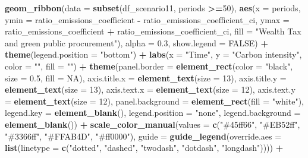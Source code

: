\documentclass[
]{article}
\newenvironment{Shaded}{\begin{snugshade}}{\end{snugshade}}
\newcommand{\AttributeTok}[1]{\textcolor[rgb]{0.13,0.29,0.53}{#1}}
\newcommand{\ConstantTok}[1]{\textcolor[rgb]{0.56,0.35,0.01}{#1}}
\newcommand{\DecValTok}[1]{\textcolor[rgb]{0.00,0.00,0.81}{#1}}
\newcommand{\FloatTok}[1]{\textcolor[rgb]{0.00,0.00,0.81}{#1}}
\newcommand{\FunctionTok}[1]{\textcolor[rgb]{0.13,0.29,0.53}{\textbf{#1}}}
\newcommand{\NormalTok}[1]{#1}
\newcommand{\SpecialCharTok}[1]{\textcolor[rgb]{0.81,0.36,0.00}{\textbf{#1}}}
\newcommand{\StringTok}[1]{\textcolor[rgb]{0.31,0.60,0.02}{#1}}
\begin{document}
\begin{Shaded}
\begin{Highlighting}[]
  \FunctionTok{geom\_ribbon}\NormalTok{(}\AttributeTok{data =} \FunctionTok{subset}\NormalTok{(df\_scenario11, periods }\SpecialCharTok{\textgreater{}=}\DecValTok{50}\NormalTok{), }\FunctionTok{aes}\NormalTok{(}\AttributeTok{x =}\NormalTok{ periods, }\AttributeTok{ymin =}\NormalTok{ ratio\_emissions\_coefficient }\SpecialCharTok{{-}}\NormalTok{ ratio\_emissions\_coefficient\_ci, }\AttributeTok{ymax =}\NormalTok{ ratio\_emissions\_coefficient }\SpecialCharTok{+}\NormalTok{ ratio\_emissions\_coefficient\_ci, }\AttributeTok{fill =} \StringTok{"Wealth Tax and green public procurement"}\NormalTok{), }\AttributeTok{alpha =} \FloatTok{0.3}\NormalTok{, }\AttributeTok{show.legend =} \ConstantTok{FALSE}\NormalTok{) }\SpecialCharTok{+}
  \FunctionTok{theme}\NormalTok{(}\AttributeTok{legend.position =} \StringTok{"bottom"}\NormalTok{) }\SpecialCharTok{+}
  \FunctionTok{labs}\NormalTok{(}\AttributeTok{x =} \StringTok{"Time"}\NormalTok{, }\AttributeTok{y =} \StringTok{"Carbon intensity"}\NormalTok{, }\AttributeTok{color =} \StringTok{""}\NormalTok{, }\AttributeTok{fill =} \StringTok{""}\NormalTok{) }\SpecialCharTok{+}
  \FunctionTok{theme}\NormalTok{(}\AttributeTok{panel.border =} \FunctionTok{element\_rect}\NormalTok{(}\AttributeTok{color =} \StringTok{"black"}\NormalTok{, }\AttributeTok{size =} \FloatTok{0.5}\NormalTok{, }\AttributeTok{fill =} \ConstantTok{NA}\NormalTok{),}
        \AttributeTok{axis.title.x =} \FunctionTok{element\_text}\NormalTok{(}\AttributeTok{size =} \DecValTok{13}\NormalTok{),}
        \AttributeTok{axis.title.y =} \FunctionTok{element\_text}\NormalTok{(}\AttributeTok{size =} \DecValTok{13}\NormalTok{),}
        \AttributeTok{axis.text.x =} \FunctionTok{element\_text}\NormalTok{(}\AttributeTok{size =} \DecValTok{12}\NormalTok{),}
        \AttributeTok{axis.text.y =} \FunctionTok{element\_text}\NormalTok{(}\AttributeTok{size =} \DecValTok{12}\NormalTok{),}
        \AttributeTok{panel.background =} \FunctionTok{element\_rect}\NormalTok{(}\AttributeTok{fill =} \StringTok{"white"}\NormalTok{),}
        \AttributeTok{legend.key =} \FunctionTok{element\_blank}\NormalTok{(),}
         \AttributeTok{legend.position =} \StringTok{"none"}\NormalTok{,}
        \AttributeTok{legend.background =} \FunctionTok{element\_blank}\NormalTok{()) }\SpecialCharTok{+}
  \FunctionTok{scale\_color\_manual}\NormalTok{(}\AttributeTok{values =} \FunctionTok{c}\NormalTok{(}\StringTok{"\#45ff66"}\NormalTok{, }\StringTok{"\#EB52ff"}\NormalTok{, }\StringTok{"\#3366ff"}\NormalTok{, }\StringTok{"\#FFAB4D"}\NormalTok{, }\StringTok{"\#ff0000"}\NormalTok{),}
                     \AttributeTok{guide =} \FunctionTok{guide\_legend}\NormalTok{(}\AttributeTok{override.aes =} \FunctionTok{list}\NormalTok{(}\AttributeTok{linetype =} \FunctionTok{c}\NormalTok{(}\StringTok{"dotted"}\NormalTok{, }\StringTok{"dashed"}\NormalTok{, }\StringTok{"twodash"}\NormalTok{, }\StringTok{"dotdash"}\NormalTok{, }\StringTok{"longdash"}\NormalTok{)))) }\SpecialCharTok{+}

\end{Highlighting}
\end{Shaded}
\end{document}
